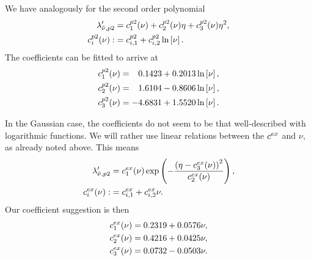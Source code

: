 \documentclass[8.5pt,twoside,twocolumn]{article}
\theoremstyle{standard}
\begin{document}
We have analogously for the second order polynomial
\begin{equation}
\begin{aligned}
\lambda_{\tilde \nu,{p2}}'&=c^{p2}_1(\nu)+c^{p2}_2(\nu)\eta+c^{p2}_3(\nu)\eta^2, \\
c^{p2}_i(\nu):&=c^{p2}_{i,1}+c^{p2}_{i,2}\ln\left[{\nu}\right].
\end{aligned}
\end{equation}
The coefficients can be fitted to arrive at
\begin{equation}
\begin{aligned}
c^\pt_1(\nu)&=\ph{-}0.1423+0.2013\ln\ed{\nu},\\
c^\pt_2(\nu)&=\ph{-}1.6104-0.8606\ln\ed{\nu},\\
c^\pt_3(\nu)&=-4.6831+1.5520\ln\ed{\nu}.
\end{aligned}
\end{equation}

In the Gaussian case, the coefficients do not seem to be that well-described with
logarithmic functions. We will rather use linear relations between the $c^{ex}$ and
$\nu$, as already noted above. This means
\begin{equation}
\begin{aligned}
\lambda_{\tilde \nu,{p2}}'&=c_1^{ex}(\nu) \exp\left({-\frac{\left({\eta-c_3^{ex}(\nu)}\right)^2}{c_2^{ex}(\nu)}}\right),\\
c^{ex}_i(\nu):&=c^{ex}_{i,1}+c^{ex}_{i,2}\nu.
\end{aligned}
\end{equation}
Our coefficient suggestion is then
\begin{equation}
\begin{aligned}
c^{ex}_1(\nu)&=0.2319+0.0576\nu,\\
c^{ex}_2(\nu)&=0.4216+0.0425\nu,\\
c^{ex}_3(\nu)&=0.0732-0.0503\nu.
\end{aligned}
\end{equation}
\end{document}
